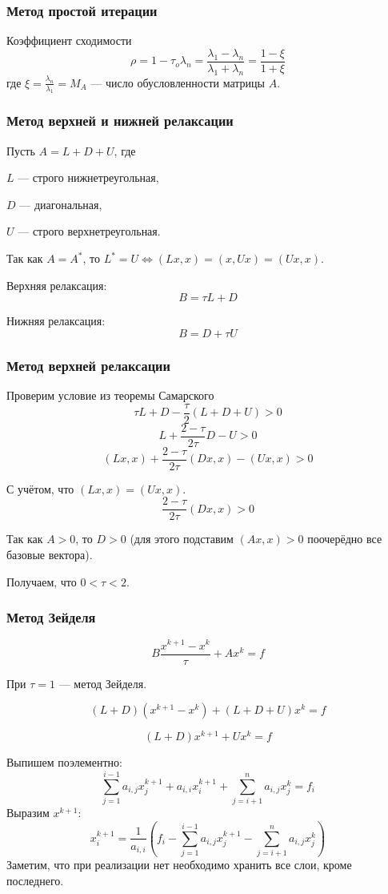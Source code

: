 \documentclass[10pt]{beamer}
\begin{document}
\begin{frame}[fragile]
\frametitle{Метод простой итерации}

Коэффициент сходимости
$$ \rho = 1 - \tau_o \lambda_n = \frac{\lambda_1 - \lambda_n}{\lambda_1 + \lambda_n} = \frac{1 - \xi}{1 + \xi}$$
где $\xi = \frac{\lambda_n}{\lambda_1} = M_A$ --- число обусловленности матрицы $A$.
\end{frame}

\begin{frame}[fragile]
\frametitle{Метод верхней и нижней релаксации}
\vfill

Пусть $A = L + D + U$, где 

$L$ --- строго нижнетреугольная, 

$D$ --- диагональная, 

$U$ --- строго верхнетреугольная.

\vfill
Так как $A = A^*$, то $L^* = U \Leftrightarrow (Lx, x) = (x, Ux) = (Ux, x)$.

\vfill
Верхняя релаксация:
$$B = \tau L + D$$

Нижняя релаксация:
$$B =  D + \tau U$$
\vfill

\end{frame}

\begin{frame}[fragile]
\frametitle{Метод верхней релаксации}

Проверим условие из теоремы Самарского
$$\tau L + D - \frac{\tau}{2} (L + D + U) > 0$$
$$ L + \frac{2 - \tau}{2 \tau} D - U > 0$$
$$ (L x, x) + \frac{2 - \tau}{2 \tau} (D x, x) - (U x, x) > 0$$

С учётом, что $(Lx, x) = (Ux, x)$.
$$ \frac{2 - \tau}{2 \tau} (D x, x) > 0$$

Так как $A > 0$, то $D > 0$ (для этого подставим $(Ax, x) > 0$ поочерёдно все базовые вектора).
\vfill

Получаем, что $0 < \tau < 2$.
\end{frame}

\begin{frame}[fragile]
\frametitle{Метод Зейделя}

$$B \frac{x^{k+1} - x^k}{\tau} + A x^k = f$$

\vfill
При $\tau = 1$ --- метод Зейделя.

$$(L + D) (x^{k+1} - x^k) + (L + D + U) x^k = f$$

$$(L + D) x^{k+1} + U x^k = f$$

\vfill

Выпишем поэлементно:
$$\sum_{j=1}^{i-1} a_{i,j} x_{j}^{k+1} + a_{i,i} x_{i}^{k+1} + \sum_{j=i+1}^{n} a_{i,j} x_{j}^k = f_i$$
Выразим $x^{k+1}$:
$$x_{i}^{k+1} = \frac{1}{a_{i,i}} \left( f_i - \sum_{j = 1}^{i-1} a_{i,j} x_{j}^{k+1} - \sum_{j = i+1}^{n} a_{i,j} x_{j}^k \right) $$
Заметим, что при реализации нет необходимо хранить все слои, кроме последнего.

\end{frame}
\end{document}
